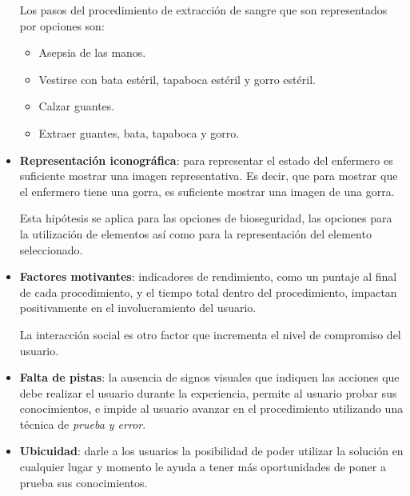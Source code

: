 \begin{itemize}
    
    Los pasos del procedimiento de extracción de sangre que son representados
    por opciones son:
    \begin{itemize}
        \item Asepsia de las manos.
        \item Vestirse con bata estéril, tapaboca estéril y gorro estéril.
        \item Calzar guantes.
        \item Extraer guantes, bata, tapaboca y gorro.
    \end{itemize}
    
\item
    \textbf{Representación iconográfica}: para representar el estado del
    enfermero es suficiente mostrar una imagen representativa. Es decir, que
    para mostrar que el enfermero tiene una gorra, es suficiente mostrar una
    imagen de una gorra.
    
    Esta hipótesis se aplica para las opciones de bioseguridad, las opciones
    para la utilización de elementos así como para la representación del
    elemento seleccionado.
\item 
    \textbf{Factores motivantes}: indicadores de rendimiento, como un puntaje al
    final de cada procedimiento, y el tiempo total dentro del procedimiento,
    impactan positivamente en el involucramiento del usuario.

    La interacción social es otro factor que incrementa el nivel de compromiso
    del usuario.

\item 
    \textbf{Falta de pistas}: la ausencia de signos visuales que indiquen las
    acciones que debe realizar el usuario durante la experiencia, permite al
    usuario probar sus conocimientos, e impide al usuario avanzar en el
    procedimiento utilizando una técnica de \emph{prueba y error}.
    
\item 
    \textbf{Ubicuidad}: darle a los usuarios la posibilidad de poder utilizar 
    la solución en cualquier lugar y momento le ayuda a tener más oportunidades 
    de poner a prueba sus conocimientos.

\end{itemize}

